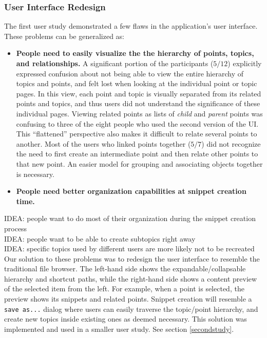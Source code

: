 \documentclass{sig-alt-release2}
\newcommand{\idea}[1]{{\color{blue} IDEA: #1}\\}
\begin{document}
\subsubsection{User Interface Redesign}
The first user study demonstrated a few flaws in the application's user interface. These problems can be generalized as:
\begin{itemize}
	\item \textbf{People need to easily visualize the the hierarchy of points, topics, and relationships.} A significant portion of the participants ($5/12$) explicitly expressed confusion about not being able to view the entire hierarchy of topics and points, and felt lost when looking at the individual point or topic pages. In this view, each point and topic is visually separated from its related points and topics, and thus users did not understand the significance of these individual pages. Viewing related points as lists of {\it child} and {\it parent} points was confusing to three of the eight people who used the second version of the UI. This ``flattened'' perspective also makes it difficult to relate several points to another. Most of the users who linked points together ($5/7$) did not recognize the need to first create an intermediate point and then relate other points to that new point. An easier model for grouping and associating objects together is necessary.
	\item \textbf{People need better organization capabilities at snippet creation time.}
\end{itemize}

\idea{people want to do most of their organization during the snippet creation process}
\idea{people want to be able to create subtopics right away}
\idea{specific topics used by different users are more likely not to be recreated}

Our solution to these problems was to redesign the user interface to resemble the traditional file browser. The left-hand side shows the expandable/collapsable hierarchy and shortcut paths, while the right-hand side shows a content preview of the selected item from the left. For example, when a point is selected, the preview shows its snippets and related points. Snippet creation will resemble a \texttt{save as...} dialog where users can easily traverse the topic/point hierarchy, and create new topics inside existing ones as deemed necessary.
This solution was implemented and used in a smaller user study. See section \ref{secondstudy}.
\end{document}
